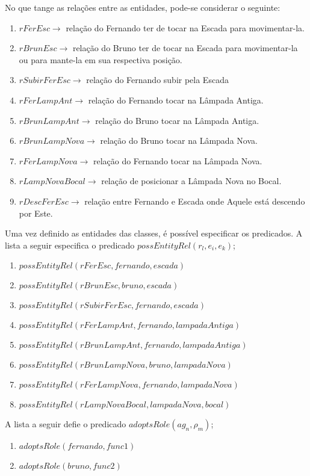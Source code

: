 No que tange as relações entre as entidades, pode-se considerar o seguinte: 

\begin{enumerate}
	\item $rFerEsc \to$ relação do Fernando ter de tocar na Escada para movimentar-la. 
	\item $rBrunEsc \to$ relação do Bruno ter de tocar na Escada para movimentar-la ou para mante-la em sua respectiva posição.
	\item $rSubirFerEsc \to$ relação do Fernando subir pela Escada
	\item $rFerLampAnt \to$ relação do Fernando tocar na Lâmpada Antiga. 
	\item $rBrunLampAnt \to$ relação do Bruno tocar na Lâmpada Antiga.
	\item $rBrunLampNova \to$ relação do Bruno tocar na Lâmpada Nova.
	\item $rFerLampNova \to$ relação do Fernando tocar na Lâmpada Nova.
	\item $rLampNovaBocal \to$  relação de posicionar a Lâmpada Nova no Bocal. 	
	\item $rDescFerEsc \to$ relação entre Fernando e Escada onde Aquele está descendo por Este.
\end{enumerate}


Uma vez definido as entidades das classes, é possível especificar os predicados. A lista a seguir especifica o predicado $possEntityRel(r_l,e_i,e_k)$;

\begin{enumerate}
	\item $possEntityRel(rFerEsc,fernando,escada)$
	\item $possEntityRel(rBrunEsc,bruno,escada)$
	\item $possEntityRel(rSubirFerEsc,fernando,escada)$
	\item $possEntityRel(rFerLampAnt,fernando,lampadaAntiga)$
	\item $possEntityRel(rBrunLampAnt,fernando,lampadaAntiga)$
	\item $possEntityRel(rBrunLampNova,bruno,lampadaNova)$
	\item $possEntityRel(rFerLampNova,fernando,lampadaNova)$
	\item $possEntityRel(rLampNovaBocal,lampadaNova,bocal)$
\end{enumerate}

A lista a seguir defie o predicado $adoptsRole(ag_n,\rho_m)$;

\begin{enumerate}
	\item $adoptsRole(fernando,func1)$
	\item $adoptsRole(bruno,func2)$
\end{enumerate}

